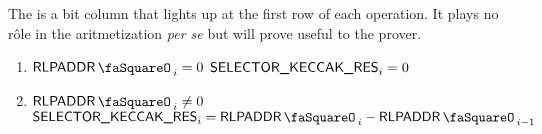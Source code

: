 The \selectorKeccakRes{} is a bit column that lights up at the first row of each operation.
It plays no rôle in the aritmetization \emph{per se} but will prove useful to the prover.
\begin{enumerate}
	\item \If $\rlpAddrStamp_{i} =    0$ \Then $\textsf{SELECTOR\_KECCAK\_RES}_{i} = 0$
 	\item \If $\rlpAddrStamp_{i} \neq 0$ \Then $\selectorKeccakRes_{i} = \rlpAddrStamp_{i} - \rlpAddrStamp_{i-1}$ 
\end{enumerate} 
